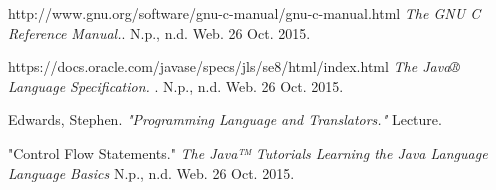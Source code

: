 \begin{homeworkProblem}
	
	
	\begin{thebibliography}{9}
		http://www.gnu.org/software/gnu-c-manual/gnu-c-manual.html
		\textit{The GNU C Reference Manual.}. 
		N.p., n.d. Web. 26 Oct. 2015.
		
		https://docs.oracle.com/javase/specs/jls/se8/html/index.html
		\textit{The Java® Language Specification.  }.
		N.p., n.d. Web. 26 Oct. 2015.
		
		Edwards, Stephen.
		\textit{"Programming Language and Translators."}
		 Lecture.
		 
		 "Control Flow Statements."
		 \textit{The Java™ Tutorials Learning the Java Language Language Basics}
		 N.p., n.d. Web. 26 Oct. 2015.
	\end{thebibliography}
\end{homeworkProblem}